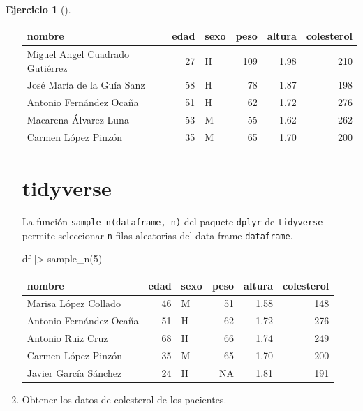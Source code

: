 \documentclass[
  spanish,
  a4paper,
]{scrreport}
\newenvironment{Shaded}{\begin{snugshade}}{\end{snugshade}}
\newcommand{\DecValTok}[1]{\textcolor[rgb]{0.68,0.00,0.00}{#1}}
\newcommand{\FunctionTok}[1]{\textcolor[rgb]{0.28,0.35,0.67}{#1}}
\newcommand{\NormalTok}[1]{\textcolor[rgb]{0.00,0.23,0.31}{#1}}
\newcommand{\SpecialCharTok}[1]{\textcolor[rgb]{0.37,0.37,0.37}{#1}}
\theoremstyle{definition}
\newtheorem{exercise}{Ejercicio}[chapter]
\theoremstyle{remark}
\begin{document}
\begin{exercise}[]
\begin{enumerate}
\begin{tcolorbox}
  \begin{longtable}[]{@{}lrlrrr@{}}
  \toprule\noalign{}
  nombre & edad & sexo & peso & altura & colesterol \\
  \midrule\noalign{}
  \endhead
  \bottomrule\noalign{}
  \endlastfoot
  Miguel Angel Cuadrado Gutiérrez & 27 & H & 109 & 1.98 & 210 \\
  José María de la Guía Sanz & 58 & H & 78 & 1.87 & 198 \\
  Antonio Fernández Ocaña & 51 & H & 62 & 1.72 & 276 \\
  Macarena Álvarez Luna & 53 & M & 55 & 1.62 & 262 \\
  Carmen López Pinzón & 35 & M & 65 & 1.70 & 200 \\
  \end{longtable}

  \section{tidyverse}

  La función \texttt{sample\_n(dataframe,\ n)} del paquete
  \texttt{dplyr} de \texttt{tidyverse} permite seleccionar \texttt{n}
  filas aleatorias del data frame \texttt{dataframe}.

\begin{Shaded}
\begin{Highlighting}[]
\NormalTok{df }\SpecialCharTok{|\textgreater{}} \FunctionTok{sample\_n}\NormalTok{(}\DecValTok{5}\NormalTok{)}
\end{Highlighting}
\end{Shaded}

  \begin{longtable}[]{@{}lrlrrr@{}}
  \toprule\noalign{}
  nombre & edad & sexo & peso & altura & colesterol \\
  \midrule\noalign{}
  \endhead
  \bottomrule\noalign{}
  \endlastfoot
  Marisa López Collado & 46 & M & 51 & 1.58 & 148 \\
  Antonio Fernández Ocaña & 51 & H & 62 & 1.72 & 276 \\
  Antonio Ruiz Cruz & 68 & H & 66 & 1.74 & 249 \\
  Carmen López Pinzón & 35 & M & 65 & 1.70 & 200 \\
  Javier García Sánchez & 24 & H & NA & 1.81 & 191 \\
  \end{longtable}

  \end{tcolorbox}
\item
  Obtener los datos de colesterol de los pacientes.


\end{enumerate}
\end{exercise}
\end{document}
